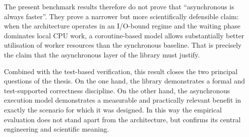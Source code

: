 The present benchmark results therefore do not prove that “asynchronous is always faster”. They prove a narrower but more scientifically defensible claim: when the architecture operates in an I/O-bound regime and the waiting phase dominates local CPU work, a coroutine-based model allows substantially better utilisation of worker resources than the synchronous baseline. That is precisely the claim that the asynchronous layer of the library must justify.

Combined with the test-based verification, this result closes the two principal questions of the thesis. On the one hand, the library demonstrates a formal and test-supported correctness discipline. On the other hand, the asynchronous execution model demonstrates a measurable and practically relevant benefit in exactly the scenario for which it was designed. In this way the empirical evaluation does not stand apart from the architecture, but confirms its central engineering and scientific meaning.
